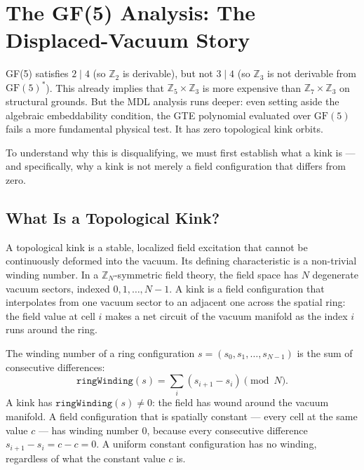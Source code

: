 \documentclass[11pt,openany]{book}
\theoremstyle{remark}
\begin{document}
\section{The GF(5) Analysis: The Displaced-Vacuum Story}
\label{sec:gf5}

GF(5) satisfies $2 \mid 4$ (so $\mathbb{Z}_2$ is derivable), but not $3 \mid 4$
(so $\mathbb{Z}_3$ is not derivable from $\mathrm{GF}(5)^*$). This already implies
that $\mathbb{Z}_5\times\mathbb{Z}_3$ is more expensive than $\mathbb{Z}_7\times\mathbb{Z}_3$
on structural grounds. But the MDL analysis runs deeper: even setting aside the algebraic
embeddability condition, the GTE polynomial evaluated over $\mathrm{GF}(5)$ fails a
more fundamental physical test. It has zero topological kink orbits.

To understand why this is disqualifying, we must first establish what a kink is ---
and specifically, why a kink is not merely a field configuration that differs from zero.

\subsection*{What Is a Topological Kink?}

A topological kink is a stable, localized field excitation that cannot be continuously
deformed into the vacuum. Its defining characteristic is a non-trivial winding number.
In a $\mathbb{Z}_N$-symmetric field theory, the field space has $N$ degenerate vacuum
sectors, indexed $0, 1, \ldots, N-1$. A kink is a field configuration that interpolates
from one vacuum sector to an adjacent one across the spatial ring: the field value at
cell $i$ makes a net circuit of the vacuum manifold as the index $i$ runs around the
ring.

The winding number of a ring configuration $s = (s_0, s_1, \ldots, s_{N-1})$ is the
sum of consecutive differences:
\begin{equation}
  \mathtt{ringWinding}(s) = \sum_{i} (s_{i+1} - s_i) \pmod N.
  \label{eq:winding}
\end{equation}
A kink has $\mathtt{ringWinding}(s) \neq 0$: the field has wound around the vacuum
manifold. A field configuration that is spatially constant --- every cell at the same
value $c$ --- has winding number $0$, because every consecutive difference $s_{i+1}-s_i
= c - c = 0$. A uniform constant configuration has no winding, regardless of what the
constant value $c$ is.
\end{document}
